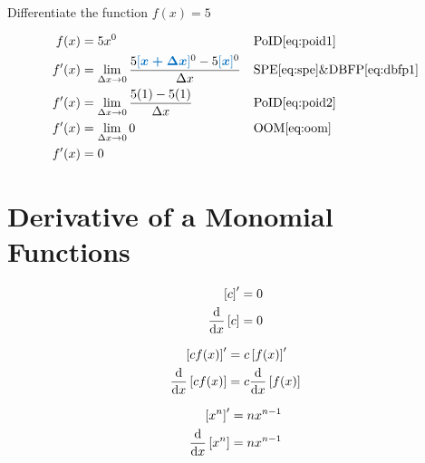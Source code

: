 \documentclass[20150903-160354-rs2.2-MarksMathNotebook.tex]{subfiles}
\begin{document}
\begin{example}[id:20141219-212546] \label{20141219-212546} \hfill \\

Differentiate the function $f(x)=5$

\soln

\solnsteps
\begin{align*}
f(x) & = 5x^0 && \text{PoID} \eqref{eq:poid1} \\
f'(x) &= \displaystyle \lim_{\Delta x \to 0} \dfrac{5\farg{x+\Delta x}^0-5\farg{x}^0}{\Delta x} && \text{SPE} \eqref{eq:spe} \& \text{DBFP} \eqref{eq:dbfp1}\\
f'(x) &= \displaystyle \lim_{\Delta x \to 0} \dfrac {5(1)-5(1)}{\Delta x} && \text{PoID} \eqref{eq:poid2} \\
f'(x) &= \displaystyle \lim_{\Delta x \to 0} 0 && \text{OOM} \eqref{eq:oom} \\
f'(x) &= 0 %
\end{align*}

\end{example}

\section{Derivative of a Monomial Functions}

\begin{arule}
\begin{align}
	\left[c \right]' &= 0 \label{eq:dc1} \\
	\dfrac{\mathrm{d}}{\mathrm{d}x} \left[c \right]&=0  \label{eq:dc2}
\end{align}
\end{arule}

\begin{arule}
\begin{align}
	\left[c f(x) \right]' &= c \left[f(x)\right]' \label{eq:dcm1} \\
	\dfrac{\mathrm{d}}{\mathrm{d}x}\left[c f(x) \right] &= c \dfrac{\mathrm{d}}{\mathrm{d}x}\left[f(x)\right]  \label{eq:dcm2}
\end{align}
\end{arule}

\begin{arule}
\begin{align}
	\left[x^n \right]'&= n x^{n-1} \label{eq:dpo1} \\
	\dfrac{\mathrm{d}}{\mathrm{d}x} \left[x^n \right] &= n x^{n-1}  \label{eq:dpo2}
\end{align}
\end{arule}
\end{document}
